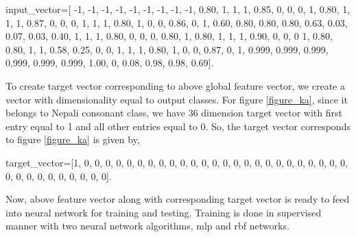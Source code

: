 input\_vector=[ -1, -1, -1, -1, -1, -1, -1, -1, -1, 0.80, 1, 1, 1, 0.85, 0, 0, 0, 1, 0.80, 1, 1, 1, 0.87, 0, 0, 0, 1, 1, 1, 0.80, 1, 0, 0, 0.86, 0, 1, 0.60, 0.80, 0.80, 0.80, 0.63, 0.03, 0.07, 0.03, 0.40, 1, 1, 1, 0.80, 0, 0, 0, 0.80, 1, 0.80, 1, 1, 1, 0.90, 0, 0, 0	1, 0.80, 0.80, 1, 1, 0.58, 0.25, 0, 0, 1, 1, 1, 0.80, 1, 0, 0, 0.87, 0, 1, 0.999, 0.999, 0.999, 0.999, 0.999, 0.999, 1.00, 0, 0.08, 0.98, 0.98, 0.69].

To create target vector corresponding to above global feature vector, we create a vector with dimensionality equal to output classes. For figure \ref{figure_ka}, since it belongs to Nepali consonant class, we have 36 dimension target vector with first entry equal to 1 and all other entries equal to 0. So, the target vector corresponds to figure \ref{figure_ka} is given by,\par
target\_vector=[1, 0, 0, 0, 0, 0, 0, 0, 0, 0, 0, 0, 0, 0, 0, 0, 0, 0, 0, 0, 0, 0, 0, 0, 0, 0, 0, 0, 0, 0, 0, 0, 0, 0, 0, 0].

Now, above feature vector along with corresponding target vector is ready to feed into neural network for training and testing. Training is done in supervised manner with two neural network algorithms, \ac{mlp} and \ac{rbf} networks.



